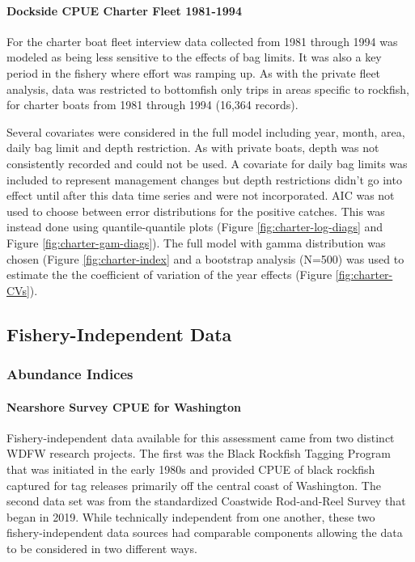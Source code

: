 \documentclass[11pt,
  english,
  letterpaper,
]{article}
\begin{document}
\hypertarget{dockside-cpue-charter-fleet-1981-1994}{%
\paragraph{Dockside CPUE Charter Fleet 1981-1994}\label{dockside-cpue-charter-fleet-1981-1994}}

For the charter boat fleet interview data collected from 1981 through 1994 was modeled as being less sensitive to the effects of bag limits. It was also a key period in the fishery where effort was ramping up. As with the private fleet analysis, data was restricted to bottomfish only trips in areas specific to rockfish, for charter boats from 1981 through 1994 (16,364 records).

Several covariates were considered in the full model including year, month, area, daily bag limit and depth restriction. As with private boats, depth was not consistently recorded and could not be used. A covariate for daily bag limits was included to represent management changes but depth restrictions didn't go into effect until after this data time series and were not incorporated. AIC was not used to choose between error distributions for the positive catches. This was instead done using quantile-quantile plots (Figure \ref{fig:charter-log-diags} and Figure \ref{fig:charter-gam-diags}). The full model with gamma distribution was chosen (Figure \ref{fig:charter-index} and a bootstrap analysis (N=500) was used to estimate the the coefficient of variation of the year effects (Figure \ref{fig:charter-CVs}).

\hypertarget{fishery-independent-data}{%
\subsection{Fishery-Independent Data}\label{fishery-independent-data}}

\hypertarget{abundance-indices-1}{%
\subsubsection{Abundance Indices}\label{abundance-indices-1}}

\hypertarget{nearshore-survey-cpue-for-washington}{%
\paragraph{Nearshore Survey CPUE for Washington}\label{nearshore-survey-cpue-for-washington}}

Fishery-independent data available for this assessment came from two distinct WDFW research projects. The first was the Black Rockfish Tagging Program that was initiated in the early 1980s and provided CPUE of black rockfish captured for tag releases primarily off the central coast of Washington. The second data set was from the standardized Coastwide Rod-and-Reel Survey that began in 2019. While technically independent from one another, these two fishery-independent data sources had comparable components allowing the data to be considered in two different ways.
\end{document}
